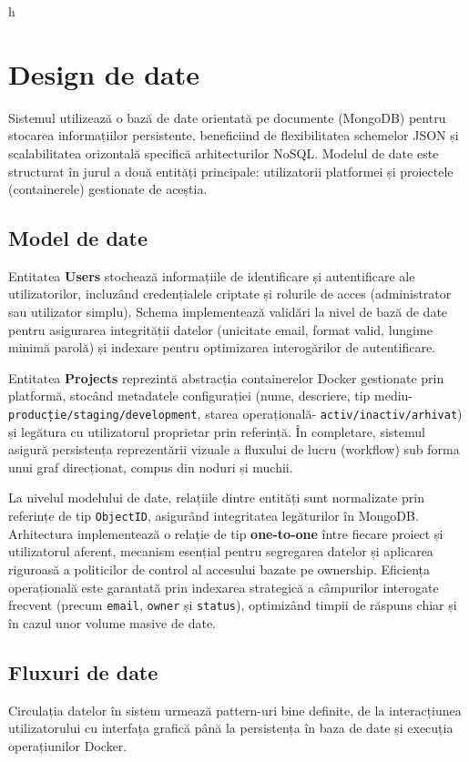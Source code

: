 h\documentclass[12pt,a4paper]{article}
\begin{document}
\section{Design de date}

\hspace{1em} Sistemul utilizează o bază de date orientată pe documente (MongoDB) pentru stocarea informațiilor persistente, beneficiind de flexibilitatea schemelor JSON și scalabilitatea orizontală specifică arhitecturilor NoSQL. Modelul de date este structurat în jurul a două entități principale: utilizatorii platformei și proiectele (containerele) gestionate de aceștia. 

\subsection{Model de date}
\hspace{1em}Entitatea \textbf{Users} stochează informațiile de identificare și autentificare ale utilizatorilor, incluzând credențialele criptate și rolurile de acces (administrator sau utilizator simplu). Schema implementează validări la nivel de bază de date pentru asigurarea integrității datelor (unicitate email, format valid, lungime minimă parolă) și indexare pentru optimizarea interogărilor de autentificare. 

Entitatea \textbf{Projects} reprezintă abstracția containerelor Docker gestionate prin platformă, stocând metadatele configurației (nume, descriere, tip mediu- \texttt{producție/staging/development}, starea operațională- \texttt{activ/inactiv/arhivat}) și legătura cu utilizatorul proprietar prin referință. În completare, sistemul asigură persistența reprezentării vizuale a fluxului de lucru (workflow) sub forma unui graf direcționat, compus din noduri și muchii.

La nivelul modelului de date, relațiile dintre entități sunt normalizate prin referințe de tip \texttt{ObjectID}, asigurând integritatea legăturilor în MongoDB. Arhitectura implementează o relație de tip \textbf{one-to-one} între fiecare proiect și utilizatorul aferent, mecanism esențial pentru segregarea datelor și aplicarea riguroasă a politicilor de control al accesului bazate pe ownership. Eficiența operațională este garantată prin indexarea strategică a câmpurilor interogate frecvent (precum \texttt{email}, \texttt{owner} și \texttt{status}), optimizând timpii de răspuns chiar și în cazul unor volume masive de date. 


\subsection{Fluxuri de date}
\hspace{1em} Circulația datelor în sistem urmează pattern-uri bine definite, de la interacțiunea utilizatorului cu interfața grafică până la persistența în baza de date și execuția operațiunilor Docker. 
\end{document}
